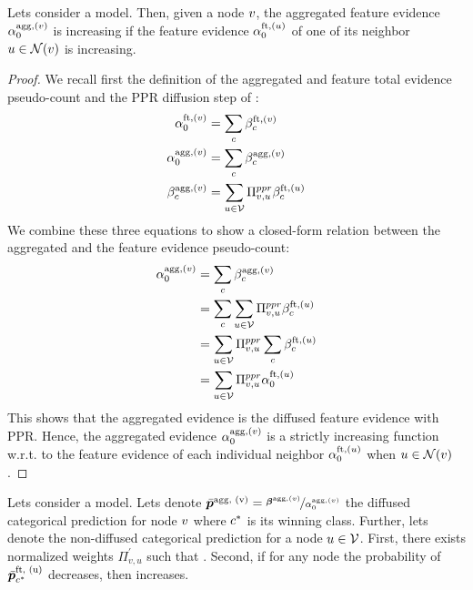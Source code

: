 \begin{theorem}
\label{thm:axiom-network-epistemic-proof}
Lets consider a \oursacro{} model. Then, given a node $v$, the aggregated feature evidence $\alpha_0^{\text{agg}, (v)}$ is increasing if the feature evidence $\alpha_0^{\text{ft}, (u)}$ of one of its neighbor $u \in \mathcal{N}(v)$ is increasing.
\end{theorem}

\begin{proof}
We recall first the definition of the aggregated and feature total evidence pseudo-count and the PPR diffusion step of \oursacro{}:
\begin{align*}
    \alpha_0^{\text{ft}, (v)} &= \sum_c \beta_c^{\text{ft}, (v)}\\
    \alpha_0^{\text{agg}, (v)} &= \sum_c \beta_c^{\text{agg}, (v)}\\
    \beta_c^{\text{agg}, (v)} &= \sum_{u \in \mathcal{V}} \Pi^{ppr}_{v, u} \beta_c^{\text{ft}, (u)}
\end{align*}
We combine these three equations to show a closed-form relation between the aggregated and the feature evidence pseudo-count:
\begin{align*}
    \alpha_0^{\text{agg}, (v)} &= \sum_c \beta_c^{\text{agg}, (v)}\\
    &= \sum_c \sum_{u \in \mathcal{V}} \Pi^{ppr}_{v, u} \beta_c^{\text{ft}, (u)}\\
    &= \sum_{u \in \mathcal{V}} \Pi^{ppr}_{v, u} \sum_c \beta_c^{\text{ft}, (u)}\\
    &= \sum_{u \in \mathcal{V}} \Pi^{ppr}_{v, u} \alpha_0^{\text{ft}, (u)}
\end{align*}
This shows that the aggregated evidence is the diffused feature evidence with PPR. Hence, the aggregated evidence $\alpha_0^{\text{agg}, (v)}$ is a strictly increasing function w.r.t. to the feature evidence of each individual neighbor $\alpha_0^{\text{ft}, (u)}$ when $u \in \mathcal{N}(v)$.
\end{proof}

\begin{theorem}
\label{thm:axiom-network-aleatoric-proof}
Lets consider a \oursacro{} model. Lets denote $\bar{\bm{p}}^\text{agg, (v)} = \nicefrac{\bm{\beta}^{\text{agg}, (v)}}{\alpha_0^{\text{agg}, (v)}}$ the diffused categorical prediction for node $v$ where $c^*$ is its winning class. Further, lets denote  the non-diffused categorical prediction for a node $\nodeu \in \vertices$. First, there exists normalized weights $\Pi_{v, u}^{'}$ such that . Second, if for any node \smash{$\nodeu \in \vertices$} the probability of $\bar{\bm{p}}_{c^*}^\text{ft, (u)}$ decreases, then  increases.
\end{theorem}

